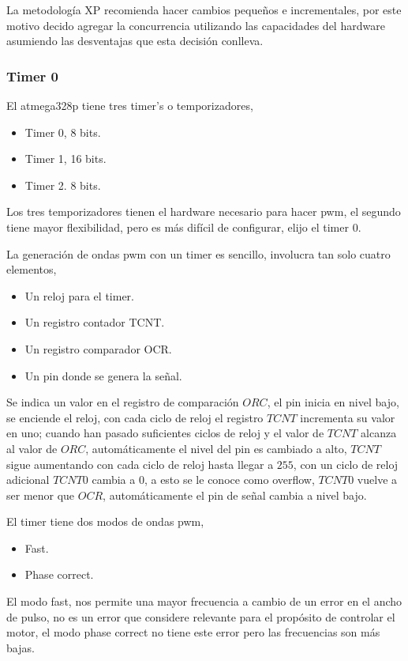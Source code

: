 La metodología XP recomienda hacer cambios pequeños e incrementales, por este motivo
decido agregar la concurrencia utilizando las capacidades del hardware asumiendo
las desventajas que esta decisión conlleva. 

\subsubsection{Timer 0}
El atmega328p tiene tres timer's o temporizadores,
\begin{itemize}
	\item Timer 0, 8 bits.
	\item Timer 1, 16 bits.
	\item Timer 2. 8 bits.
\end{itemize}
Los tres temporizadores tienen el hardware necesario para hacer pwm, el segundo 
tiene mayor flexibilidad, pero es más difícil de configurar, elijo el timer 0.

La generación de ondas pwm con un timer es sencillo, involucra tan solo cuatro 
elementos,
\begin{itemize}
	\item Un reloj para el timer.
	\item Un registro contador TCNT.
	\item Un registro comparador OCR.
	\item Un pin donde se genera la señal.
\end{itemize}
Se indica un valor en el registro de comparación $ORC$, el pin inicia en nivel bajo,
se enciende el reloj, 
con cada ciclo de reloj el registro $TCNT$ incrementa su valor en uno; cuando han 
pasado suficientes ciclos de reloj y el valor de $TCNT$ alcanza al valor de $ORC$,
automáticamente el nivel del pin es cambiado a alto, $TCNT$ sigue aumentando con
cada ciclo de reloj hasta  llegar a $255$, con un ciclo de reloj adicional $TCNT0$ 
cambia a $0$, a esto se le conoce como overflow, $TCNT0$ vuelve a ser menor que
$OCR$, automáticamente el pin de señal cambia a nivel bajo.

El timer tiene dos modos de ondas pwm, 
\begin{itemize}
	\item Fast.
	\item Phase correct.
\end{itemize}
El modo fast, nos permite una mayor frecuencia a cambio de un error en el ancho 
de pulso, no es un error que considere relevante para el propósito de controlar
el motor, el modo phase correct no tiene este error pero las frecuencias son
más bajas.

